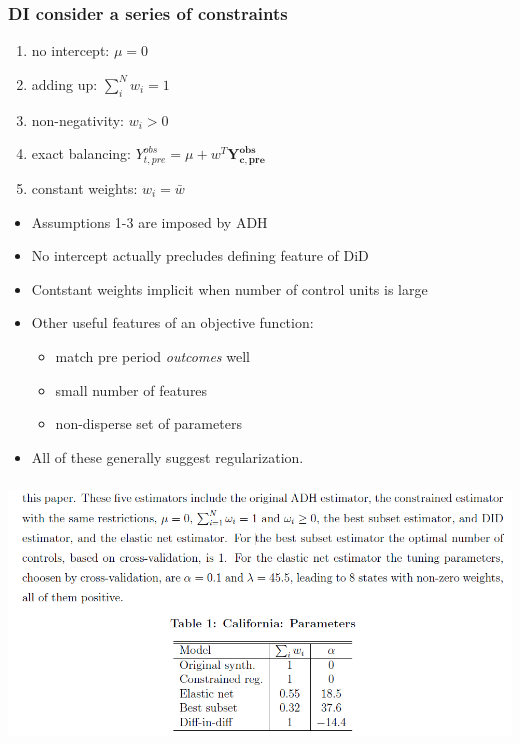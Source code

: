 \begin{frame}
    \frametitle{DI consider a series of constraints}
  \begin{enumerate}
    \item no intercept: $\mu = 0$
    \item adding up: $ \sum_i^N w_i = 1$
    \item non-negativity: $w_i > 0$ 
    \item exact balancing: $Y_{t,pre}^{obs} = \mu + w^T\mathbf{Y_{c,pre}^{obs}}$
    \item constant weights: $w_i = \bar w$ 
  \end{enumerate}

  \begin{itemize}
    \item Assumptions 1-3 are imposed by ADH 
    \item No intercept actually precludes defining feature of DiD
    \item Contstant weights implicit when number of control units is large
    \item Other useful features of an objective function:
    \begin{itemize}
      \item match pre period \textit{outcomes} well 
      \item small number of features 
      \item non-disperse set of parameters
    \end{itemize}
    \item All of these generally suggest regularization. 
  \end{itemize}
\end{frame}

\begin{frame}
  \frametitle{}
  \begin{center}
    \includegraphics[height=.9\textheight]{./resources/DI_CAweights}
  \end{center}  
\end{frame}

